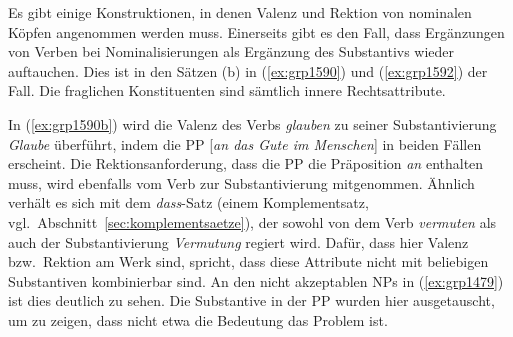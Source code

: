 \label{sec:rektioninderngr}


Es gibt einige Konstruktionen, in denen Valenz und Rektion von nominalen Köpfen angenommen werden muss.
Einerseits gibt es den Fall, dass Ergänzungen von Verben bei Nominalisierungen als Ergänzung des Substantivs wieder auftauchen.
Dies ist in den Sätzen (b) in (\ref{ex:grp1590}) und (\ref{ex:grp1592}) der Fall.
Die fraglichen Konstituenten sind sämtlich innere Rechtsattribute.

\begin{exe}
  \ex\label{ex:grp1590}
  \begin{xlist}
  \end{xlist}
  \ex\label{ex:grp1592}
  \begin{xlist}
  \end{xlist}
\end{exe}

In (\ref{ex:grp1590b}) wird die Valenz des Verbs \textit{glauben} zu seiner Substantivierung \textit{Glaube} überführt, indem die PP [\textit{an das Gute im Menschen}] in beiden Fällen erscheint.
Die Rektionsanforderung, dass die PP die Präposition \textit{an} enthalten muss, wird ebenfalls vom Verb zur Substantivierung mitgenommen.
Ähnlich verhält es sich mit dem \textit{dass}-Satz (einem Komplementsatz, vgl.\ Abschnitt~\ref{sec:komplementsaetze}), der sowohl von dem Verb \textit{vermuten} als auch der Substantivierung \textit{Vermutung} regiert wird.
Dafür, dass hier Valenz bzw.\ Rektion am Werk sind, spricht, dass diese Attribute nicht mit beliebigen Substantiven kombinierbar sind.
An den nicht akzeptablen NPs in (\ref{ex:grp1479}) ist dies deutlich zu sehen.
Die Substantive in der PP wurden hier ausgetauscht, um zu zeigen, dass nicht etwa die Bedeutung das Problem ist.

\begin{exe}
  \ex\label{ex:grp1479}
  \begin{xlist}
  \end{xlist}
\end{exe}

